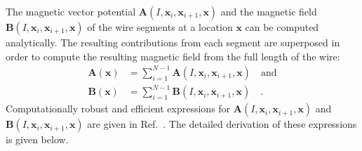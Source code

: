 The magnetic vector potential $\mathbf{A}(I, \mathbf{x}_i, \mathbf{x}_{i+1}, \mathbf{x})$ and the magnetic field $\mathbf{B}(I, \mathbf{x}_i, \mathbf{x}_{i+1}, \mathbf{x})$
of the wire segments at a location $\mathbf{x}$ can be computed analytically.
The resulting contributions from each segment are superposed in order to compute the resulting magnetic field from the full length of the wire:
\begin{align}
 \mathbf{A}(\mathbf{x}) & = \sum_{i=1}^{N-1} \mathbf{A}(I, \mathbf{x}_i, \mathbf{x}_{i+1}, \mathbf{x}) \quad \mathrm{and} \\
 \mathbf{B}(\mathbf{x}) & = \sum_{i=1}^{N-1} \mathbf{B}(I, \mathbf{x}_i, \mathbf{x}_{i+1}, \mathbf{x}) \quad .
\end{align}
Computationally robust and efficient expressions for
$\mathbf{A}(I, \mathbf{x}_i, \mathbf{x}_{i+1}, \mathbf{x})$ and
$\mathbf{B}(I, \mathbf{x}_i, \mathbf{x}_{i+1}, \mathbf{x})$
are given in Ref.~\cite{hanson_hirshman_2002}.
The detailed derivation of these expressions is given below.

